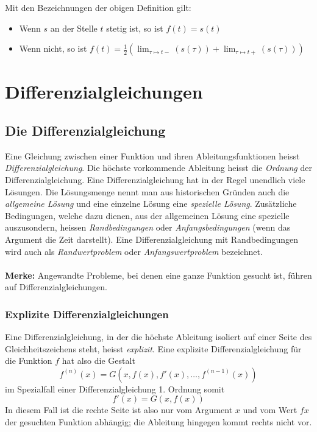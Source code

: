\documentclass[10pt,a4paper]{scrartcl}
\begin{document}
Mit den Bezeichnungen der obigen Definition gilt:
\begin{itemize}
\item Wenn $s$ an der Stelle $t$ stetig ist, so ist $f(t) = s(t)$
\item Wenn nicht, so ist $\displaystyle f(t) = \frac{1}{2} \left(\lim_{\tau \mapsto t-}(s(\tau)) + \lim_{\tau \mapsto t+}(s(\tau))\right)$
\end{itemize}




\section{Differenzialgleichungen}

\subsection{Die Differenzialgleichung}

Eine Gleichung zwischen einer Funktion und ihren Ableitungsfunktionen heisst \textit{Differenzialgleichung}.
Die höchste vorkommende Ableitung heisst die \textit{Ordnung} der Differenzialgleichung. Eine
Differenzialgleichung hat in der Regel unendlich viele Lösungen. Die Lösungsmenge nennt man aus
historischen Gründen auch die \textit{allgemeine Lösung} und eine einzelne Lösung eine \textit{spezielle Lösung}.
Zusätzliche Bedingungen, welche dazu dienen, aus der allgemeinen Lösung eine spezielle auszusondern,
heissen \textit{Randbedingungen} oder \textit{Anfangsbedingungen} (wenn das Argument die Zeit darstellt).
Eine Differenzialgleichung mit Randbedingungen wird auch als \textit{Randwertproblem} oder \textit{Anfangswertproblem}
bezeichnet.\\\\
\textbf{Merke:} Angewandte Probleme, bei denen eine ganze Funktion gesucht ist, führen auf Differenzialgleichungen.


\subsubsection{Explizite Differenzialgleichungen}

Eine Differenzialgleichung, in der die höchste Ableitung isoliert auf einer Seite des
Gleichheitszeichens steht, heisst \textit{explizit}. Eine explizite Differenzialgleichung
für die Funktion $f$ hat also die Gestalt
$$f^{(n)}(x) = G\left(x,f(x),f'(x),\dotsc,f^{(n-1)}(x)\right)$$
im Spezialfall einer Differenzialgleichung 1. Ordnung somit
$$f'(x) = G(x,f(x))$$
In diesem Fall ist die rechte Seite ist also nur vom Argument $x$ und vom Wert $fx$ der
gesuchten Funktion abhängig; die Ableitung hingegen kommt rechts nicht vor.
\end{document}
